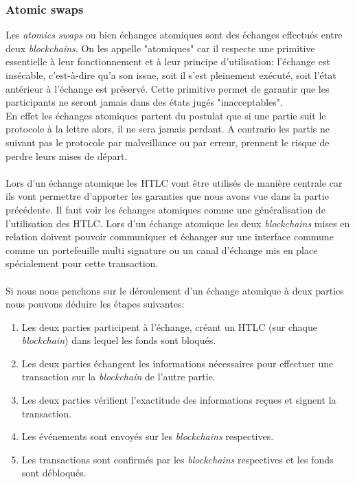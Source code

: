 \subsubsection{Atomic swaps}
Les \textit{atomics swaps} ou bien échanges atomiques sont des échanges effectués entre deux \textit{\gls{blockchain}s}\cite{herlihy2018atomic}. On les appelle "atomiques" car il respecte une primitive essentielle à leur fonctionnement et à leur principe d'utilisation: 
l'échange est insécable, c'est-à-dire qu'a son issue, soit il s'est pleinement exécuté, soit l'état antérieur à l'échange est préservé.
Cette primitive permet de garantir que les participants ne seront jamais dans des états jugés "inacceptables". \\
En effet les échanges atomiques partent du postulat que si une partie suit le protocole à la lettre alors, 
il ne sera jamais perdant. A contrario les partis ne suivant pas le protocole par malveillance ou par erreur, prennent le risque de perdre leurs mises de départ.\\ \\
Lors d'un échange atomique les HTLC vont être utilisés de manière centrale car ils vont permettre d'apporter les garanties que nous avons vue dans la partie précédente. Il faut voir les échanges atomiques comme une généralisation de l'utilisation des HTLC. Lors d'un échange atomique les deux \textit{\gls{blockchain}s} mises en relation doivent pouvoir communiquer et échanger sur une interface commune comme un portefeuille multi signature ou un canal d'échange mis en place spécialement pour cette transaction. \\ \\
Si nous nous penchons sur le déroulement d'un échange atomique à deux parties nous pouvons déduire les étapes suivantes: 
\begin{enumerate}
    \item Les deux parties participent à l'échange, créant un HTLC (sur chaque \textit{\gls{blockchain}}) dans lequel les fonds sont bloqués. 
    \item Les deux parties échangent les informations nécessaires pour effectuer une transaction sur la \textit{\gls{blockchain}} de l'autre partie. 
    \item Les deux parties vérifient l'exactitude des informations reçues et signent la transaction. 
    \item Les événements sont envoyés sur les \textit{\gls{blockchain}s} respectives. 
    \item Les transactions sont confirmés par les \textit{\gls{blockchain}s} respectives et les fonds sont débloqués.
\end{enumerate}

